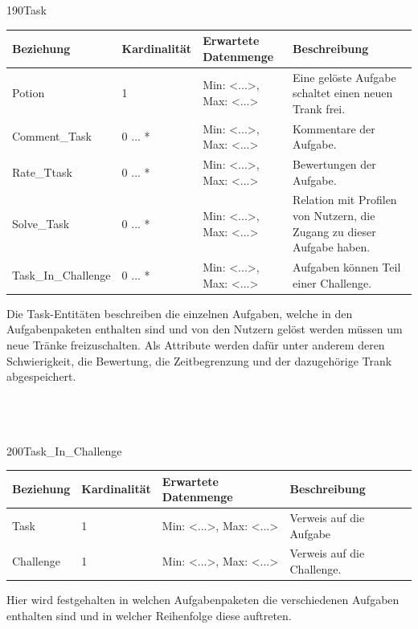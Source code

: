 \newpage
\begin{entity}{190}{Task}
\begin{center}
	\begin{longtable}{|m{4cm}|m{}|m{}|m{}|}
 	 \hline
 	 \textbf{Beziehung} & \textbf{Kardinalität} &  \textbf{Erwartete Datenmenge} & \textbf{Beschreibung} \\
  	\hline
	Potion & 1 & Min: <...>, Max: <...> & Eine gelöste Aufgabe schaltet einen neuen Trank frei.\\
	  \hline
	Comment\_Task & 0 ... * & Min: <...>, Max: <...> & Kommentare der Aufgabe.\\
	  \hline
	Rate\_Ttask & 0 ... * & Min: <...>, Max: <...> & Bewertungen der Aufgabe.\\
	  \hline
	Solve\_Task & 0 ... * & Min: <...>, Max: <...> & Relation mit Profilen von Nutzern, die Zugang zu dieser Aufgabe haben.\\
	  \hline
	Task\_In\_Challenge & 0 ... * & Min: <...>, Max: <...> & Aufgaben können Teil einer Challenge.\\
	  \hline
	\end{longtable}
\end{center}
Die \glqq Task\grqq-Entitäten beschreiben die einzelnen Aufgaben, welche in den Aufgabenpaketen enthalten sind und von den Nutzern gelöst werden müssen um neue Tränke freizuschalten. Als Attribute werden dafür unter anderem deren Schwierigkeit, die Bewertung, die Zeitbegrenzung und der dazugehörige Trank abgespeichert. \\\\\\\
\end{entity}

\begin{entity}{200}{Task\_In\_Challenge}
\begin{center}
	\begin{longtable}{|m{4cm}|m{}|m{}|m{}|}
 	 \hline
 	 \textbf{Beziehung} & \textbf{Kardinalität} &  \textbf{Erwartete Datenmenge} & \textbf{Beschreibung} \\
  	\hline
	Task & 1 & Min: <...>, Max: <...> & Verweis auf die Aufgabe\\
	  \hline
  	Challenge & 1  & Min: <...>, Max: <...> & Verweis auf die Challenge.\\
	  \hline
	\end{longtable}
\end{center}
Hier wird festgehalten in welchen Aufgabenpaketen die verschiedenen Aufgaben enthalten sind und in welcher Reihenfolge diese auftreten.\\\\\\\
\end{entity}

